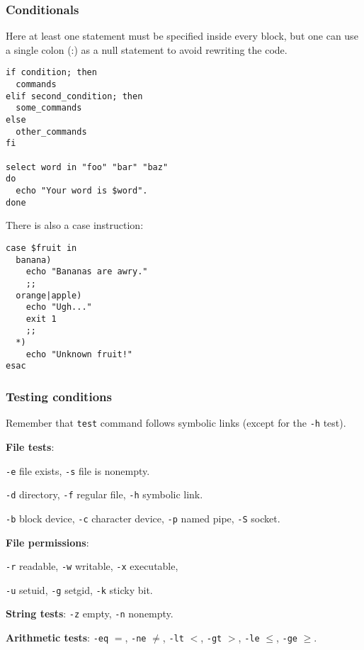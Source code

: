 \subsubsection{Conditionals}
Here at least one statement must be specified inside every block,
but one can use a single colon (:) as a null statement to avoid
rewriting the code.

\begin{verbatim}
if condition; then
  commands
elif second_condition; then
  some_commands
else
  other_commands	
fi

select word in "foo" "bar" "baz"
do
  echo "Your word is $word".
done
\end{verbatim}

There is also a case instruction:
\begin{verbatim}
case $fruit in
  banana)
    echo "Bananas are awry."
    ;;
  orange|apple)
    echo "Ugh..."
    exit 1
    ;;
  *)
    echo "Unknown fruit!"
esac
\end{verbatim}



\subsubsection{Testing conditions}
Remember that \texttt{test} command follows symbolic links (except for the \texttt{-h} test).
\begin{itemx} 
\item \textbf{File tests}:
\begin{enumx}
    \item \texttt{-e} file exists, 
    \texttt{-s} file is nonempty. 
    \item \texttt{-d} directory, 
    \texttt{-f} regular file, 
    \texttt{-h} symbolic link. 
    \item \texttt{-b} block device, 
    \texttt{-c} character device, 
    \texttt{-p} named pipe, 
    \texttt{-S} socket.
\end{enumx}
\item \textbf{File permissions}:
\begin{enumx}
    \item \texttt{-r} readable,
    \texttt{-w} writable,
    \texttt{-x} executable,
    \item \texttt{-u} setuid,
    \texttt{-g} setgid,
    \texttt{-k} sticky bit.
\end{enumx}
\item \textbf{String tests}: \texttt{-z} empty, \texttt{-n} nonempty.
\item \textbf{Arithmetic tests}: 
\texttt{-eq} $=$, 
\texttt{-ne} $\neq$, 
\texttt{-lt} $<$, 
\texttt{-gt} $>$, 
\texttt{-le} $\le$, 
\texttt{-ge} $\ge$.
\end{itemx}

